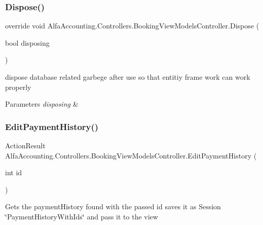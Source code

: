 \subsubsection{\texorpdfstring{Dispose()}{Dispose()}}
{\footnotesize\ttfamily override void Alfa\+Accounting.\+Controllers.\+Booking\+View\+Models\+Controller.\+Dispose (\begin{DoxyParamCaption}\item[{bool}]{disposing }\end{DoxyParamCaption})\hspace{0.3cm}{\ttfamily [protected]}}



dispose database related garbege after use so that entitiy frame work can work properly 


\begin{DoxyParams}{Parameters}
{\em disposing} & \\
\hline
\end{DoxyParams}
\mbox{\label{class_alfa_accounting_1_1_controllers_1_1_booking_view_models_controller_a0dbca25c3000615589dd5f52b9d0df7b}} 
\subsubsection{\texorpdfstring{Edit\+Payment\+History()}{EditPaymentHistory()}\hspace{0.1cm}{\footnotesize\ttfamily [1/2]}}
{\footnotesize\ttfamily Action\+Result Alfa\+Accounting.\+Controllers.\+Booking\+View\+Models\+Controller.\+Edit\+Payment\+History (\begin{DoxyParamCaption}\item[{int}]{id }\end{DoxyParamCaption})}



Gets the payment\+History found with the passed id saves it as Session \char`\"{}\+Payment\+History\+With\+Ids\char`\"{} and pass it to the view 


